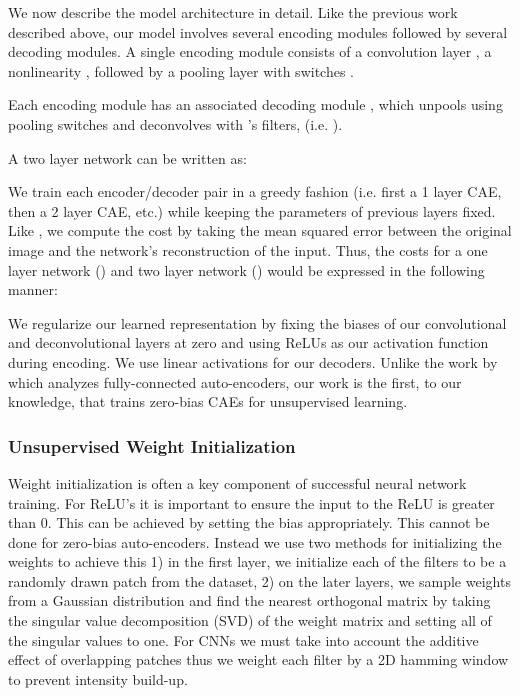 \documentclass{article} \usepackage{iclr2015,times}
\begin{document}
We now describe the model architecture in detail. Like the previous work described above, our model involves several encoding modules followed by several decoding modules. A single encoding module  consists of a convolution layer , a nonlinearity , followed by a pooling layer  with switches .



Each encoding module has an associated decoding module , which unpools using  pooling switches  and deconvolves with 's filters, (i.e. ).



A two layer network can be written as:



We train each encoder/decoder pair in a greedy fashion (i.e. first a 1 layer CAE, then a 2 layer CAE, etc.) while keeping the parameters of previous layers fixed. Like \citet{zeiler2011adaptive}, we compute the cost by taking the mean squared error between the original image and the network's reconstruction of the input. Thus, the costs for a one layer network () and two layer network () would be expressed in the following manner:


We regularize our learned representation by fixing the biases of our convolutional and deconvolutional layers at zero and using ReLUs as our activation function during encoding. We use linear activations for our decoders. Unlike the work by \citet{memisevic2014zero} which analyzes fully-connected auto-encoders, our work is the first, to our knowledge, that trains zero-bias CAEs for unsupervised learning.

\subsubsection{Unsupervised Weight Initialization}
Weight initialization is often a key component of successful neural network training. For ReLU's it is important to ensure the input to the ReLU is greater than 0. This can be achieved by setting the bias appropriately. This cannot be done for zero-bias auto-encoders. Instead we use two methods for initializing the weights to achieve this 1)  in the first layer, we initialize each of the filters to be a randomly drawn patch from the dataset, 2) on the later layers, we sample weights from a Gaussian distribution and find the nearest orthogonal matrix by taking the singular value decomposition (SVD) of the weight matrix and setting all of the singular values to one. For CNNs we must take into account the additive effect of overlapping patches thus we weight each filter by a 2D hamming window to prevent intensity build-up.
\end{document}
